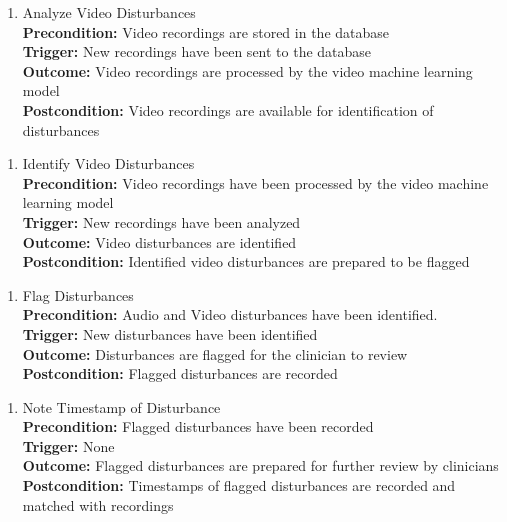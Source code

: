 \documentclass[12pt]{article}
\begin{document}
\begin{enumerate}[{PUC-}25. ]
  \item Analyze Video Disturbances\\
  \textbf{Precondition: }Video recordings are stored in the database\\
  \textbf{Trigger: }New recordings have been sent to the database\\
  \textbf{Outcome: }Video recordings are processed by the video machine learning model\\
  \textbf{Postcondition: }Video recordings are available for identification of disturbances\\
\end{enumerate}

\begin{enumerate}[{PUC-}26. ]
  \item Identify Video Disturbances\\
  \textbf{Precondition: }Video recordings have been processed by the video machine learning model\\
  \textbf{Trigger: }New recordings have been analyzed\\
  \textbf{Outcome: }Video disturbances are identified\\
  \textbf{Postcondition: }Identified video disturbances are prepared to be flagged\\
\end{enumerate}

\begin{enumerate}[{PUC-}27. ]
  \item Flag Disturbances\\
  \textbf{Precondition: }Audio and Video disturbances have been identified.\\
  \textbf{Trigger: }New disturbances have been identified\\
  \textbf{Outcome: }Disturbances are flagged for the clinician to review\\
  \textbf{Postcondition: }Flagged disturbances are recorded\\
\end{enumerate}

\begin{enumerate}[{PUC-}28. ]
  \item Note Timestamp of Disturbance\\
  \textbf{Precondition: }Flagged disturbances have been recorded\\
  \textbf{Trigger: }None\\
  \textbf{Outcome: }Flagged disturbances are prepared for further review by clinicians\\
  \textbf{Postcondition: }Timestamps of flagged disturbances are recorded and matched with recordings\\
\end{enumerate}
\end{document}
